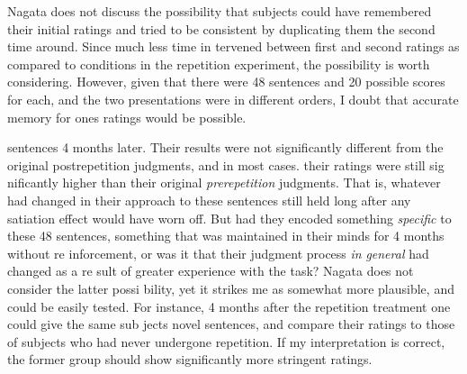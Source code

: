 \begin{listWWNumxxxiileveli}
\item 
\begin{styleStandard}
Nagata does not discuss the possibility that subjects could have remembered their initial ratings and tried to be consistent by duplicating them the second time around. Since much less time in\- tervened between first and second ratings as compared to conditions in the repetition experiment, the possibility is worth considering. However, given that there were 48 sentences and 20 possible scores for each, and the two presentations were in different orders, I doubt that accurate memory for one{\textquotesingle}s ratings would be possible.
\end{styleStandard}


\end{listWWNumxxxiileveli}
\clearpage\setcounter{page}{1}\begin{styleTextbody}
sentences 4 months later. Their results were not significantly different from the original postrepetition judgments, and in most cases. their ratings were still sig\- nificantly higher than their original \textit{prerepetition}\textit{ }judgments. That is, whatever had changed in their approach to these sentences still held long after any satiation effect would have worn off. But had they encoded something \textit{specific}\textit{ }to these 48 sentences, something that was maintained in their minds for 4 months without re\- inforcement, or was it that their judgment process \textit{in}\textit{ }\textit{general}\textit{ }had changed as a re\- sult of greater experience with the task? Nagata does not consider the latter possi\- bility, yet it strikes me as somewhat more plausible, and could be easily tested. For instance, 4 months after the repetition treatment one could give the same sub\- jects novel sentences, and compare their ratings to those of subjects who had never undergone repetition. If my interpretation is correct, the former group should show significantly more stringent ratings.
\end{styleTextbody}


